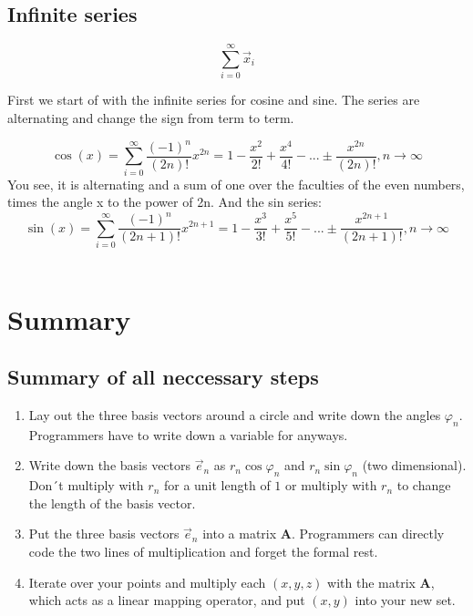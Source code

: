 \documentclass[a4paper]{article}
\begin{document}
\subsection{Infinite series}

\begin{displaymath}
    \sum_{i=0}^{\infty}\vec{x}_{i}
\end{displaymath}

First we start of with the infinite series for cosine and sine. The series are alternating and change the sign from term to term.

\begin{displaymath}
    \cos(x) = \sum_{i=0}^{\infty}\frac{(-1)^{n}}{(2n)!}x^{2n} = 1 - \frac{x^{2}}{2!} + \frac{x^{4}}{4!} - ... \pm\frac{x^{2n}}{(2n)!}, n\rightarrow\infty
\end{displaymath}
You see, it is alternating and a sum of one over the faculties of the even numbers, times the angle x to the power of 2n.
And the sin series:\\
\begin{displaymath}
    \sin(x) = \sum_{i=0}^{\infty}\frac{(-1)^{n}}{(2n+1)!}x^{2n+1} = 1 - \frac{x^{3}}{3!} + \frac{x^{5}}{5!} - ... \pm\frac{x^{2n+1}}{(2n+1)!}, n\rightarrow\infty
\end{displaymath}\\

\section{Summary}

\subsection{Summary of all neccessary steps}
\begin{enumerate}
\item Lay out the three basis vectors around a circle and write down the angles $\varphi_{n}$. Programmers have to write down a variable for anyways.
\item Write down the basis vectors $\vec{e}_{n}$ as $r_{n} \cos \varphi_{n}$ and $r_{n} \sin \varphi_{n}$ (two dimensional). Don´t multiply with $r_{n}$ for a unit length of $1$ or multiply with $r_{n}$ to change the length of the basis vector.
\item Put the three basis vectors $\vec{e}_{n}$ into a matrix $\boldsymbol{A}$. Programmers can directly code the two lines of multiplication and forget the formal rest.
\item Iterate over your points and multiply each $(x,y,z)$ with the matrix $\boldsymbol{A}$, which acts as a linear mapping operator, and put $(x,y)$ into your new set.
\end{enumerate}
\end{document}
